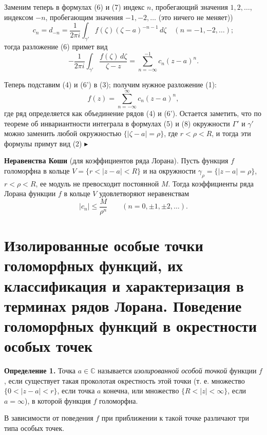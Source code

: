 \documentclass[12pt, a4paper]{article}
\theoremstyle{definition}
\theoremstyle{remark}
\begin{document}
Заменим теперь в формулах (6) и (7) индекс $n$, пробегающий значения $1, 2, \dots$, индексом $-n$, пробегающим значения $-1, -2, \dots$ (это ничего не меняет))
\begin{equation}
	c_n = d_{-n} = \frac{1}{2\pi i} \int_{\gamma'} f(\zeta) (\zeta - a)^{-n-1} \, d\zeta \quad (n = -1, -2, \dots);
	\tag{8}
\end{equation}
тогда разложение (6) примет вид
\begin{equation}
	-\frac{1}{2\pi i} \int_{\gamma'} \frac{f(\zeta) \, d\zeta}{\zeta - z} = \sum_{n=-\infty}^{-1} c_n (z - a)^n.
	\tag{6'}
\end{equation}

Теперь подставим (4) и (6') в (3); получим нужное разложение (1):
$$
f(z) = \sum_{n=-\infty}^{\infty} c_n (z - a)^n,
$$
где ряд определяется как объединение рядов (4) и (6'). Остается заметить, что по теореме об инвариантности интеграла в формулах (5) и (8) окружности $\Gamma'$ и $\gamma'$ можно заменить любой окружностью $\{|\zeta - a| = \rho\}$, где $r < \rho < R$, и тогда эти формулы примут вид (2) $\blacktriangleright$

\textbf{Неравенства Коши} (для коэффициентов ряда Лорана). 
Пусть функция $f$ голоморфна в кольце $V = \{ r < |z - a| < R \}$ и 
на окружности $\gamma_\rho = \{ |z - a| = \rho \}$, $r < \rho < R$, ее модуль не превосходит 
постоянной $M$. Тогда коэффициенты ряда Лорана функции $f$ в кольце $V$ 
удовлетворяют неравенствам
\begin{equation}
	|c_n| \leqslant \frac{M}{\rho^n} \qquad (n = 0, \pm 1, \pm 2, \ldots).
\end{equation}

\newpage
\section{Изолированные особые точки голоморфных функций, их классификация и характеризация в терминах рядов Лорана. Поведение голоморфных функций в окрестности особых точек}

\textbf{Определение 1.} Точка $a \in \mathbb{C}$ называется \textit{изолированной особой точкой} функции $f$, если существует такая проколотая окрестность этой точки (т. е. множество $\{0 < |z - a| < r\}$, если точка $a$ конечна, или множество $\{R < |z| < \infty\}$, если $a = \infty$), в которой функция $f$ голоморфна.

В зависимости от поведения $f$ при приближении к такой точке различают три типа особых точек.
\end{document}
